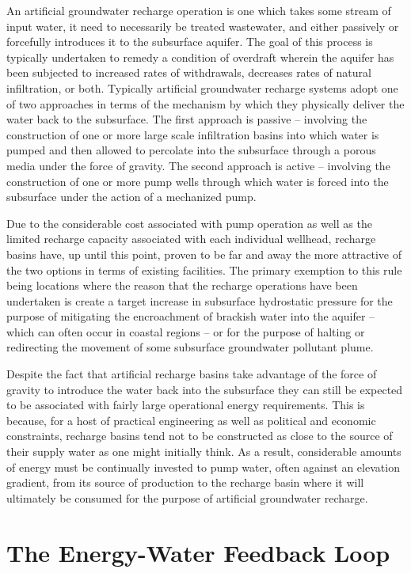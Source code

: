 An artificial groundwater recharge operation is one which takes some stream of input water, it need to necessarily be treated wastewater, and either passively or forcefully introduces it to the subsurface aquifer. The goal of this process is typically undertaken to remedy a condition of overdraft wherein the aquifer has been subjected to increased rates of withdrawals, decreases rates of natural infiltration, or both. Typically artificial groundwater recharge systems adopt one of two approaches in terms of the mechanism by which they physically deliver the water back to the subsurface. The first approach is passive -- involving the construction of one or more large scale infiltration basins into which water is pumped and then allowed to percolate into the subsurface through a porous media under the force of gravity. The second approach is active -- involving the construction of one or more pump wells through which water is forced into the subsurface under the action of a mechanized pump. 

Due to the considerable cost associated with pump operation as well as the limited recharge capacity associated with each individual wellhead, recharge basins have, up until this point, proven to be far and away the more attractive of the two options in terms of existing facilities. The primary exemption to this rule being locations where the reason that the recharge operations have been undertaken is create a target increase in subsurface hydrostatic pressure for the purpose of mitigating the encroachment of brackish water into the aquifer -- which can often occur in coastal regions -- or for the purpose of halting or redirecting the movement of some subsurface groundwater pollutant plume. 

Despite the fact that artificial recharge basins take advantage of the force of gravity to introduce the water back into the subsurface they can still be expected to be associated with fairly large operational energy requirements. This is because, for a host of practical engineering as well as political and economic constraints, recharge basins tend not to be constructed as close to the source of their supply water as one might initially think. As a result, considerable amounts of energy must be continually invested to pump water, often against an elevation gradient, from its source of production to the recharge basin where it will ultimately be consumed for the purpose of artificial groundwater recharge. 
              
 \section{The Energy-Water Feedback Loop}
 
